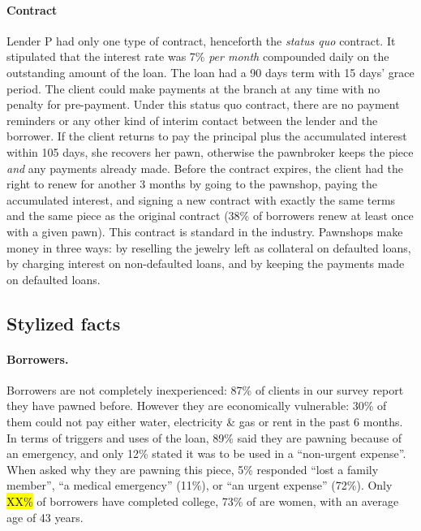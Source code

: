 \documentclass[12pt, a4paper]{article}
\begin{document}
\paragraph*{Contract} Lender P had only one type of contract, henceforth the \textit{status quo} contract. It stipulated that the interest rate was 7\% \textit{per month} compounded daily on the outstanding amount of the loan. The loan had a 90 days term with 15 days' grace period. The client could make payments at the branch at any time with no penalty for pre-payment. Under this status quo contract, there are no payment reminders or any other kind of interim contact between the lender and the borrower. If the client returns to pay the principal plus the accumulated interest within 105 days, she recovers her pawn, otherwise the pawnbroker keeps the piece \textit{and} any payments already made. Before the contract expires, the client had the right to renew for another 3 months by going to the pawnshop, paying the accumulated interest, and signing a new contract with exactly the same terms and the same piece as the original contract (38\% of borrowers renew at least once with a given pawn). This contract is standard in the industry.  Pawnshops make money in three ways: by reselling the jewelry left as collateral on defaulted loans, by charging interest on non-defaulted loans, and by keeping the payments made on defaulted loans. 

\subsection{Stylized facts}

\paragraph*{Borrowers.} Borrowers are not completely inexperienced: 87\% of clients in our survey report they have pawned before. %
However they are economically vulnerable:  30\% of them could not pay either water, electricity \& gas or rent in the past 6 months. In terms of triggers and uses of the loan, 89\% said they are pawning because of an emergency, and only 12\% stated it was to be used in a ``non-urgent expense''.  When asked why they are pawning this piece, 5\% responded ``lost a family member'', ``a medical emergency'' (11\%), or ``an urgent expense'' (72\%). Only \hl{XX\%} of borrowers have completed college, 73\% of are women, with an average age of 43 years.
\end{document}
